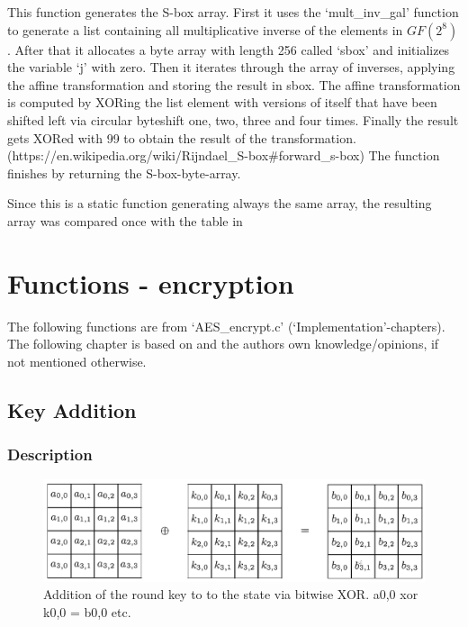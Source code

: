 This function generates the S-box array. First it uses the
`mult\_inv\_gal' function to generate a list containing all
multiplicative inverse of the elements in $GF(2^{8})$. After that it
allocates a byte array with length 256 called `sbox' and initializes the
variable `j' with zero. Then it iterates through the array of inverses,
applying the affine transformation and storing the result in sbox. The
affine transformation is computed by XORing the list element with
versions of itself that have been shifted left via circular byteshift
one, two, three and four times. Finally the result gets XORed with 99 to
obtain the result of the transformation.
(https://en.wikipedia.org/wiki/Rijndael\_S-box\#forward\_s-box) The
function finishes by returning the S-box-byte-array.

Since this is a static function generating always the same array, the
resulting array was compared once with the table in \cite[Fig. 7]{fips197}

\hypertarget{functions---encryption}{%
\section{Functions - encryption}\label{functions---encryption}}

The following functions are from `AES\_encrypt.c'
(`Implementation'-chapters). The following chapter is based on \cite{fips197} and the authors own
knowledge/opinions, if not mentioned otherwise.

\hypertarget{key-addition}{%
\subsection{Key Addition}\label{key-addition}}

\hypertarget{description-2}{%
\subsubsection{Description}\label{description-2}}

\begin{figure}
\centering
\includegraphics[scale = 0.3]{data/figures/addroundkey.png}
\caption{Addition of the round key to to the state via bitwise XOR. a0,0 xor k0,0 = b0,0 etc.}
\end{figure}

